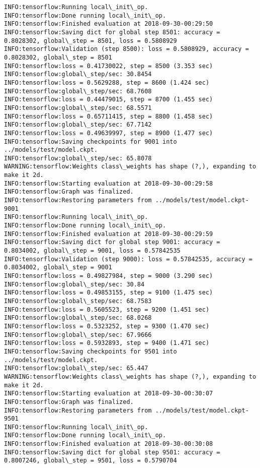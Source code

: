 \documentclass[11pt]{article}
\begin{document}
\begin{Verbatim}[commandchars=\\\{\}]
INFO:tensorflow:Running local\_init\_op.
INFO:tensorflow:Done running local\_init\_op.
INFO:tensorflow:Finished evaluation at 2018-09-30-00:29:50
INFO:tensorflow:Saving dict for global step 8501: accuracy = 0.8028302, global\_step = 8501, loss = 0.5808929
INFO:tensorflow:Validation (step 8500): loss = 0.5808929, accuracy = 0.8028302, global\_step = 8501
INFO:tensorflow:loss = 0.41730022, step = 8500 (3.353 sec)
INFO:tensorflow:global\_step/sec: 30.8454
INFO:tensorflow:loss = 0.5629288, step = 8600 (1.424 sec)
INFO:tensorflow:global\_step/sec: 68.7608
INFO:tensorflow:loss = 0.44479015, step = 8700 (1.455 sec)
INFO:tensorflow:global\_step/sec: 68.5571
INFO:tensorflow:loss = 0.65711415, step = 8800 (1.458 sec)
INFO:tensorflow:global\_step/sec: 67.7142
INFO:tensorflow:loss = 0.49639997, step = 8900 (1.477 sec)
INFO:tensorflow:Saving checkpoints for 9001 into ../models/test/model.ckpt.
INFO:tensorflow:global\_step/sec: 65.8078
WARNING:tensorflow:Weights class\_weights has shape (?,), expanding to make it 2d.
INFO:tensorflow:Starting evaluation at 2018-09-30-00:29:58
INFO:tensorflow:Graph was finalized.
INFO:tensorflow:Restoring parameters from ../models/test/model.ckpt-9001
INFO:tensorflow:Running local\_init\_op.
INFO:tensorflow:Done running local\_init\_op.
INFO:tensorflow:Finished evaluation at 2018-09-30-00:29:59
INFO:tensorflow:Saving dict for global step 9001: accuracy = 0.8034002, global\_step = 9001, loss = 0.57842535
INFO:tensorflow:Validation (step 9000): loss = 0.57842535, accuracy = 0.8034002, global\_step = 9001
INFO:tensorflow:loss = 0.49827984, step = 9000 (3.290 sec)
INFO:tensorflow:global\_step/sec: 30.84
INFO:tensorflow:loss = 0.49853155, step = 9100 (1.475 sec)
INFO:tensorflow:global\_step/sec: 68.7583
INFO:tensorflow:loss = 0.5605523, step = 9200 (1.451 sec)
INFO:tensorflow:global\_step/sec: 68.0268
INFO:tensorflow:loss = 0.5323252, step = 9300 (1.470 sec)
INFO:tensorflow:global\_step/sec: 67.9666
INFO:tensorflow:loss = 0.5932893, step = 9400 (1.471 sec)
INFO:tensorflow:Saving checkpoints for 9501 into ../models/test/model.ckpt.
INFO:tensorflow:global\_step/sec: 65.447
WARNING:tensorflow:Weights class\_weights has shape (?,), expanding to make it 2d.
INFO:tensorflow:Starting evaluation at 2018-09-30-00:30:07
INFO:tensorflow:Graph was finalized.
INFO:tensorflow:Restoring parameters from ../models/test/model.ckpt-9501
INFO:tensorflow:Running local\_init\_op.
INFO:tensorflow:Done running local\_init\_op.
INFO:tensorflow:Finished evaluation at 2018-09-30-00:30:08
INFO:tensorflow:Saving dict for global step 9501: accuracy = 0.8007246, global\_step = 9501, loss = 0.5790704

\end{Verbatim}
\end{document}
